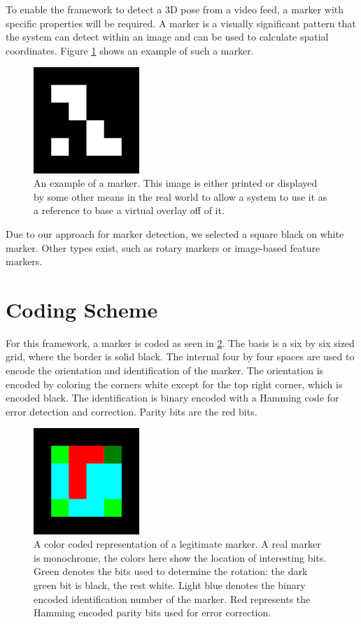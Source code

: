 \label{section_markers}

To enable the framework to detect a 3D pose from a video feed, a marker with specific properties will be required.
A marker is a visually significant pattern that the system can detect within an image and can be used to calculate spatial coordinates.
Figure \ref{fig:marker_example} shows an example of such a marker.

\begin{figure}
	\centering
	\includegraphics[width=4cm]{img/marker_example.png}
	\caption[Example Marker.]{An example of a marker. This image is either printed or displayed by some other means in the real world to allow a system to use it as a reference to base a virtual overlay off of it.}
	\label{fig:marker_example}
\end{figure}

Due to our approach for marker detection, we selected a square black on white marker.
Other types exist, such as rotary markers or image-based feature markers.

\section{Coding Scheme}

For this framework, a marker is coded as seen in \ref{fig:marker_template}.
The basis is a six by six sized grid, where the border is solid black.
The internal four by four spaces are used to encode the orientation and identification of the marker.
The orientation is encoded by coloring the corners white except for the top right corner, which is encoded black.
The identification is binary encoded with a Hamming code\cite{hamming} for error detection and correction.
Parity bits are the red bits.

\begin{figure}
	\centering
	\includegraphics[width=4cm]{img/marker_template.png}
	\caption[Template Marker.]{A color coded representation of a legitimate marker. A real marker is monochrome, the colors here show the location of interesting bits. Green denotes the bits used to determine the rotation: the dark green bit is black, the rest white. Light blue denotes the binary encoded identification number of the marker. Red represents the Hamming encoded parity bits used for error correction.}
	\label{fig:marker_template}
\end{figure}

